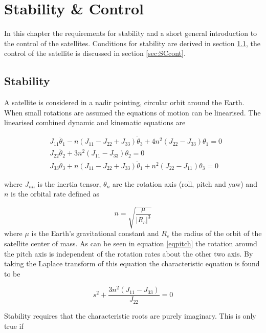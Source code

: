 \chapter{Stability \& Control}
\label{stabCont}
In this chapter the requirements for stability and a short general introduction to the control of the satellites. Conditions for stability are derived in section \ref{sec:SCstab}, the control of the satellite is discussed in section \ref{sec:SCcont}.

\section{Stability}
\label{sec:SCstab}
A satellite is considered in a nadir pointing, circular orbit around the Earth. When small rotations are assumed the equations of motion can be linearised. The linearised combined dynamic and kinematic equations are

\begin{eqnarray}
&J_{11} \ddot{\theta}_1 - n\left(J_{11}-J_{22}+J_{33}\right) \dot{\theta}_3+ 4n^2\left(J_{22}-J_{33}\right)\theta _1= 0 \label{eqroll} \\
&J_{22} \ddot{\theta}_2 + 3n^2\left(J_{11}-J_{33}\right)\theta_2= 0 \label{eqpitch} \\
&J_{33} \ddot{\theta}_3 + n\left(J_{11}-J_{22}+J_{33}\right) \dot{\theta}_1 + n^2\left(J_{22}-J_{11}\right)\theta _3= 0 \label{eqyaw}
\end{eqnarray}

where $J_{nn}$ is the inertia tensor, $\theta_n$ are the rotation axis (roll, pitch and yaw) and $n$ is the orbital rate defined as 

\begin{equation}
n=\sqrt{\frac{\mu}{|R_c|^3}}
\label{orbrate}
\end{equation}
where $\mu$ is the Earth's gravitational constant and $R_c$ the radius of the orbit of the satellite center of mass. As can be seen in equation \ref{eqpitch} the rotation around the pitch axis is independent of the rotation rates about the other two axis. By taking the Laplace transform of this equation the characteristic equation is found to be

\begin{equation}
s^2+\frac{3n^2\left(J_{11}-J_{33}\right)}{J_{22}} = 0 
\label{lappitch}
\end{equation}

Stability requires that the characteristic roots are purely imaginary. This is only true if 

